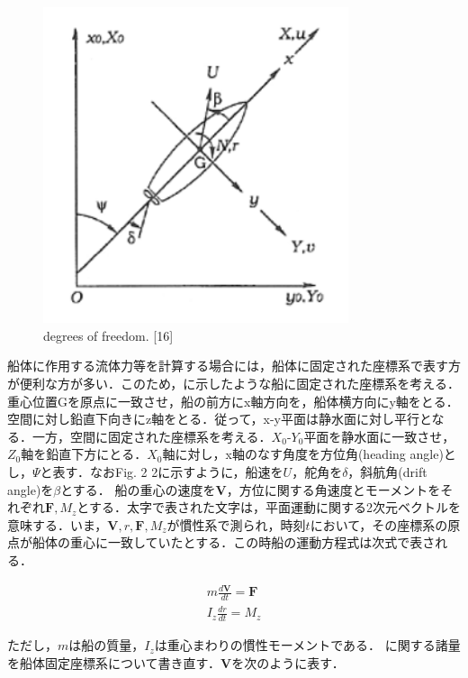 \begin{figure}[htbp]
    \centering   
    \includegraphics[width=0.8\textwidth]{img/appendix3/2-2.png}
    \caption{degrees of freedom. [16]}
    \label{fig:2-2_png}
\end{figure}

船体に作用する流体力等を計算する場合には，船体に固定された座標系で表す方が便利な方が多い．このため，に示したような船に固定された座標系を考える．重心位置Gを原点に一致させ，船の前方にx軸方向を，船体横方向にy軸をとる．空間に対し鉛直下向きにz軸をとる．従って，x-y平面は静水面に対し平行となる．一方，空間に固定された座標系を考える．$X_0$-$Y_0$平面を静水面に一致させ，$Z_0$軸を鉛直下方にとる．$X_0$軸に対し，x軸のなす角度を方位角(heading angle)とし，$\Psi$と表す．なおFig. 2 2に示すように，船速を$U$，舵角を$\delta$，斜航角(drift angle)を$\beta$とする．
船の重心の速度を$\boldsymbol{V}$，方位に関する角速度とモーメントをそれぞれ$\boldsymbol{F},M_z$とする．太字で表された文字は，平面運動に関する2次元ベクトルを意味する．いま，$\boldsymbol{V},r,\boldsymbol{F},M_z$が慣性系で測られ，時刻$t$において，その座標系の原点が船体の重心に一致していたとする．この時船の運動方程式は次式で表される．

\begin{align}
    m \frac{d \boldsymbol{V}}{d t}=\boldsymbol{F} \label{eq:2-1} \\
    I_{z} \frac{d r}{d t}=M_{z} \label{eq:2-2}
\end{align}

ただし，$m$は船の質量，$I_z$は重心まわりの慣性モーメントである．
に関する諸量を船体固定座標系について書き直す．$\boldsymbol{V}$を次のように表す．

